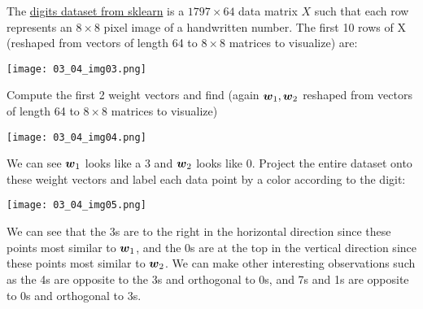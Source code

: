 \begin{example}
The \href{https://scikit-learn.org/stable/modules/generated/sklearn.datasets.load_digits.html#sklearn.datasets.load_digits}{digits dataset from sklearn} is a $1797 \times 64$ data matrix $X$ such that each row represents an $8 \times 8$ pixel image of a handwritten number. The first 10 rows of X (reshaped from vectors of length 64 to $8 \times 8$ matrices to visualize) are:
\begin{center}
\texttt{[image: 03\_04\_img03.png]}
\end{center}
Compute the first 2 weight vectors and find (again $\boldsymbol{w}_1,\boldsymbol{w}_2$ reshaped from vectors of length 64 to $8 \times 8$ matrices to visualize)
\begin{center}
\texttt{[image: 03\_04\_img04.png]}
\end{center}
We can see $\boldsymbol{w}_1$ looks like a 3 and $\boldsymbol{w}_2$ looks like 0. Project the entire dataset onto these weight vectors and label each data point by a color according to the digit:
\begin{center}
\texttt{[image: 03\_04\_img05.png]}
\end{center}
We can see that the 3s are to the right in the horizontal direction since these points most similar to $\boldsymbol{w}_1$, and the 0s are at the top in the vertical direction since these points most similar to $\boldsymbol{w}_2$. We can make other interesting observations such as the 4s are opposite to the 3s and orthogonal to 0s, and 7s and 1s are opposite to 0s and orthogonal to 3s.
\end{example}